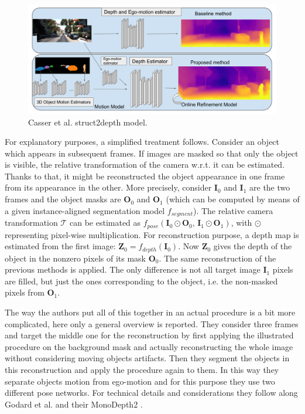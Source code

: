 \begin{figure}
	\centering
	\includegraphics[scale=0.3]{figs/struct2depth}
	\caption{Casser et al. struct2depth \cite{struct2depth} model. \label{fig:struct2depth}}
\end{figure}

For explanatory purposes, a simplified treatment follows.
Consider an object which appears in subsequent frames.
If images are masked so that only the object is visible, the relative transformation of the camera w.r.t. it can be estimated.
Thanks to that, it might be reconstructed the object appearance in one frame from its appearance in the other.
More precisely, consider $\mathbf{I}_{0}$ and $\mathbf{I}_{1}$ are the two frames and the object masks are $\mathbf{O}_{0}$ and $\mathbf{O}_{1}$ (which can be computed by means of a given instance-aligned segmentation model $f_{segment}$).
The relative camera transformation $\mathcal{T}$ can be estimated as $f_{pose}(\mathbf{I}_{0} \odot \mathbf{O}_{0}, \, \mathbf{I}_{1} \odot \mathbf{O}_{1})$, with $\odot$ representing pixel-wise multiplication.
For reconstruction purpose, a depth map is estimated from the first image: $\mathbf{Z}_{0} = f_{depth}(\mathbf{I}_{0})$.
Now $\mathbf{Z}_{0}$ gives the depth of the object in the nonzero pixels of its mask $\mathbf{O}_{0}$.
The same reconstruction of the previous methods is applied.
The only difference is not all target image $\mathbf{I}_{1}$ pixels are filled, but just the ones corresponding to the object, i.e. the non-masked pixels from $\mathbf{O}_{1}$.

The way the authors put all of this together in an actual procedure is a bit more complicated, here only a general overview is reported.
They consider three frames and target the middle one for the reconstruction by first applying the illustrated procedure on the background mask and actually reconstructing the whole image without considering moving objects artifacts.
Then they segment the objects in this reconstruction and apply the procedure again to them.
In this way they separate objects motion from ego-motion and for this purpose they use two different pose networks.
For technical details and considerations they follow along Godard et al. and their MonoDepth2 \cite{MonoDepth2}.

